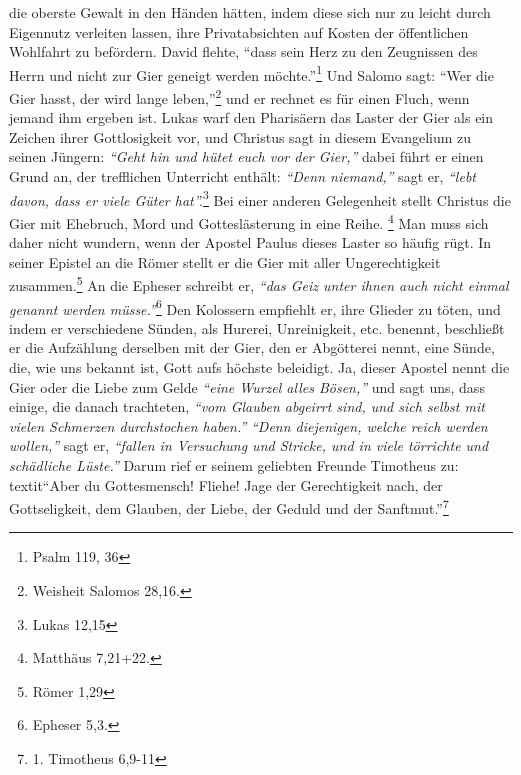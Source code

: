 die oberste Gewalt in den Händen hätten, indem diese sich nur zu leicht durch
Eigennutz verleiten lassen, ihre Privatabsichten auf Kosten der öffentlichen
Wohlfahrt zu befördern. David flehte,
"`dass sein Herz zu den Zeugnissen des
Herrn und nicht zur Gier geneigt werden möchte."'\footnote{Psalm 119, 36}
Und Salomo sagt: "`Wer die Gier hasst, der wird lange leben,"'\footnote{Weisheit Salomos 28,16.}
und er rechnet es für einen Fluch, wenn jemand ihm ergeben ist. Lukas
warf den Pharisäern das Laster der Gier als ein
Zeichen ihrer Gottlosigkeit
vor, und Christus sagt in diesem Evangelium zu seinen Jüngern:
\textit{"`Geht hin und
hütet euch vor der Gier,"'} dabei führt er einen Grund an, der trefflichen
Unterricht enthält: \textit{"`Denn niemand,"'} sagt er,
\textit{"`lebt davon, dass er viele Güter hat"'.}\footnote{Lukas 12,15}
Bei einer anderen Gelegenheit stellt Christus die Gier mit Ehebruch, Mord und
Gotteslästerung in eine Reihe.
\footnote{Matthäus 7,21+22.}
Man muss sich daher nicht wundern, wenn der Apostel Paulus dieses
Laster so häufig rügt. In seiner Epistel an die Römer stellt er die Gier mit
aller Ungerechtigkeit zusammen.\footnote{Römer 1,29}
An die Epheser schreibt er,
\textit{"`das Geiz unter ihnen auch nicht einmal genannt werden müsse."'}\footnote{Epheser 5,3.}
Den Kolossern empfiehlt er, ihre Glieder zu töten, und indem er
verschiedene Sünden, als Hurerei, Unreinigkeit, etc. benennt, beschließt er
die Aufzählung derselben mit der Gier, den er Abgötterei
nennt, eine Sünde,
die, wie uns bekannt ist, Gott aufs höchste beleidigt. Ja, dieser Apostel nennt
die Gier oder die Liebe zum Gelde \textit{"`eine Wurzel alles Bösen,"'}
 und sagt uns, dass
einige, die danach trachteten, \textit{"`vom Glauben abgeirrt sind, und sich
selbst
mit vielen Schmerzen durchstochen haben."'} \textit{"`Denn diejenigen, welche
reich
werden wollen,"'} sagt er, \textit{"`fallen in Versuchung und Stricke, und in
viele
törrichte und schädliche Lüste."'} Darum rief er seinem geliebten Freunde
Timotheus zu:\\textit{"`Aber du Gottesmensch! Fliehe! Jage der
Gerechtigkeit
nach, der Gottseligkeit, dem Glauben, der Liebe, der Geduld und der
Sanftmut."'}\footnote{1. Timotheus 6,9-11}

